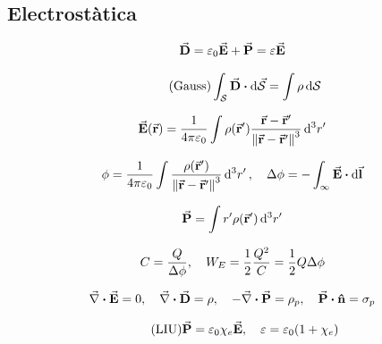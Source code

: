 \section{\mytitle}
\subsection{Electrostàtica}
\begin{align*}
	\va{D} = \varepsilon_{0} \va{E} + \va{P} = \varepsilon \va{E}
\end{align*}

\begin{align}\tag{Gauss}
	\int_{\mc{S}} \va{D} \vdot \dd{\va{\mc{S}}} = \int \rho \dd{\mc{S}}
\end{align}

\begin{align*}
	\va{E}(\va{r}) = \frac{1}{4\pi \varepsilon_{0}} \int \rho(\va{r}') \frac{\va{r} - \va{r}'}{\norm{\va{r} - \va{r}'}^{3}} \dd[3]{r'}
\end{align*}

\begin{align*}
	\phi = \frac{1}{4\pi \varepsilon_{0}} \int \frac{\rho(\va{r}')}{\norm{\va{r} - \va{r}'}^{3}} \dd[3]{r'} \qc \Delta \phi = - \int_{\infty} \va{E} \vdot \dd{\va{l}}
\end{align*}

\begin{align*}
	\va{P} = \int r' \rho(\va{r}') \dd[3]{r'}
\end{align*}

\begin{align*}
	C = \frac{Q}{\Delta \phi} \qc W_{E} = \frac{1}{2} \frac{Q^{2}}{C} = \frac{1}{2} Q \Delta \phi
\end{align*}

\begin{align*}
	 \div{E} = 0 \qc \div{D} = \rho \qc -\div{P} = \rho_{p} \qc \va{P} \vdot \vu{n} = \sigma_{p}
\end{align*}

\begin{align}\tag{LIU}
	\va{P} = \varepsilon_{0} \chi_{e} \va{E} \qc \varepsilon = \varepsilon_{0}\qty(1 + \chi_{e})
\end{align}

